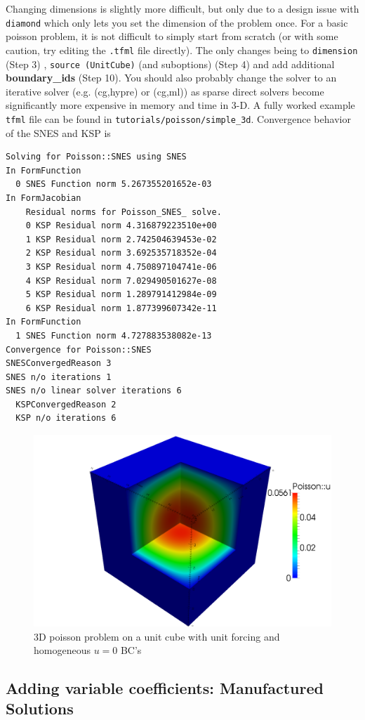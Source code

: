 Changing dimensions is slightly more difficult, but only due to a
design issue with \texttt{diamond} which only lets you set the
dimension of the problem once.  For a basic poisson problem, it is not
difficult to simply start from scratch (or with some caution, try
editing the \texttt{.tfml} file directly). The only changes being to
\texttt{dimension} (Step 3) , \texttt{source (UnitCube)} (and
suboptions) (Step 4)  and
add additional \textbf{boundary\_ids} (Step 10).  You should also
probably change the solver to an iterative solver (e.g. (cg,hypre) or (cg,ml)) as
sparse direct solvers become significantly more expensive in memory
and time in 3-D.  A fully worked example \texttt{tfml} file can be
found in \texttt{tutorials/poisson/simple\_3d}.
Convergence behavior of the SNES and KSP is
\begin{lstlisting}[style=Bash]
Solving for Poisson::SNES using SNES
In FormFunction
  0 SNES Function norm 5.267355201652e-03 
In FormJacobian
    Residual norms for Poisson_SNES_ solve.
    0 KSP Residual norm 4.316879223510e+00 
    1 KSP Residual norm 2.742504639453e-02 
    2 KSP Residual norm 3.692535718352e-04 
    3 KSP Residual norm 4.750897104741e-06 
    4 KSP Residual norm 7.029490501627e-08 
    5 KSP Residual norm 1.289791412984e-09 
    6 KSP Residual norm 1.877399607342e-11 
In FormFunction
  1 SNES Function norm 4.727883538082e-13 
Convergence for Poisson::SNES
SNESConvergedReason 3
SNES n/o iterations 1
SNES n/o linear solver iterations 6
  KSPConvergedReason 2
  KSP n/o iterations 6
\end{lstlisting}
\begin{figure}[ht!]
  \centering
  \includegraphics[width=.7\textwidth]{figures/poisson_simple_3d}
  \caption{3D poisson problem on a unit cube with unit forcing and homogeneous $u=0$ BC's}
  \label{fig:poisson-3D}
\end{figure}

\pagebreak
\subsection{Adding variable coefficients: Manufactured Solutions}
\label{sec:manuf-solut}

